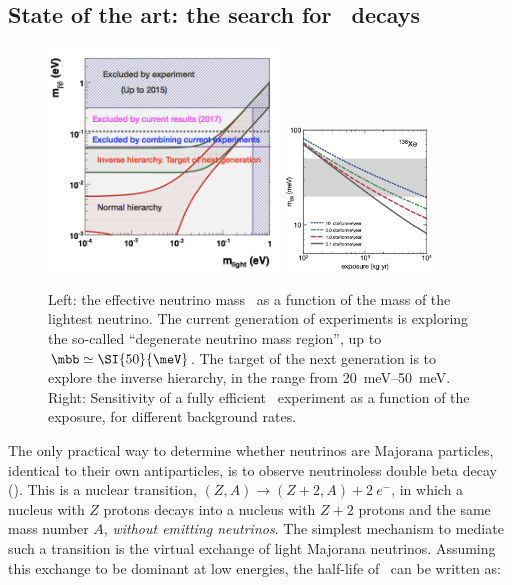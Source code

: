 \subsection{State of the art: the search for \bbonu\ decays}
\label{sec.state}

\begin{figure}[thb!]
\centering
\includegraphics[width=0.55\textwidth]{img/landscape.png}
\includegraphics[width=0.35\textwidth]{img/sensi-xenon.png}
\caption{\small Left: the effective neutrino mass \mbb\ as a function of the mass of the lightest neutrino. The current generation of experiments is exploring the so-called ``degenerate neutrino mass region'', up to $\mbb \simeq \SI{50}{\meV}$.  The target of the next generation is to explore the inverse hierarchy, in the range from \SIrange{20}{50}{\meV}. Right: Sensitivity of a fully efficient \XE\ experiment as a function of the exposure, for different background rates.}
\label{fig:Majorana-Landscape}
\end{figure}

The only practical way to determine whether neutrinos are Majorana particles, identical to their own antiparticles, is to observe neutrinoless double beta decay (\bbonu). This is a nuclear transition, $(Z,A) \rightarrow (Z+2,A) + 2\ e^{-}$, in which a nucleus with $Z$ protons decays into a nucleus with $Z+2$ protons and the same mass number $A$, {\em without emitting neutrinos}. The simplest mechanism to mediate such a transition is the virtual exchange of light Majorana neutrinos. Assuming this exchange to be  dominant at low energies, the half-life of \bbonu\ can be written as:

